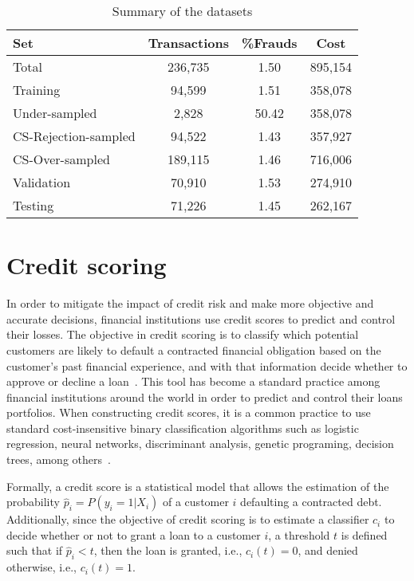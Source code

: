 	\begin{table}[t]
	\caption{Summary of the datasets}
	\label{tab:datasets}
	\centering
	\begin{tabular}{l c c c } %
		\\
		\hline
		\textbf{Set}&	\textbf{Transactions} &	\textbf{\%Frauds} & 
		\textbf{Cost} \\
		\hline
		Total&236,735&1.50&895,154\\
		Training&94,599&1.51&358,078\\
		Under-sampled&2,828&50.42&358,078\\
		CS-Rejection-sampled&94,522&1.43&357,927\\
		CS-Over-sampled&189,115&1.46&716,006\\
		Validation&70,910&1.53&274,910\\
		Testing&71,226&1.45&262,167\\
		\hline
	\end{tabular}
\end{table}


\section{Credit scoring}
\label{sec:4:creditscoring}

  In order to mitigate the impact of credit risk and make more objective and accurate decisions, 
  financial institutions use credit scores to predict and control their losses.
  The objective in credit scoring is to classify which potential customers are likely to default a 
  contracted financial obligation based on the customer's past financial experience, and with that 
  information decide whether to approve or decline a loan~\citep{Anderson2007}. This tool has 
  become a standard practice among financial institutions around the world in order to predict 
  and control their loans portfolios. When constructing credit scores, it is a common practice to 
  use standard cost-insensitive binary classification algorithms such as logistic regression, 
  neural networks, discriminant analysis, genetic programing, decision trees, among 
  others~\citep{Hand1997,Bahnsen2011}. 
  
  Formally, a credit score is a statistical model that allows the estimation of the probability 
  $\hat p_i=P(y_i=1|X_i)$ of a customer $i$ defaulting a contracted debt. Additionally, since the 
  objective of credit scoring is to estimate a classifier $c_i$ to decide whether or not to grant a 
  loan to a customer $i$, a threshold $t$ is defined such that if $\hat p_i <t$, then the loan is 
  granted, i.e., $c_i(t)=0$, and denied otherwise, i.e., $c_i(t)=1$.
  
